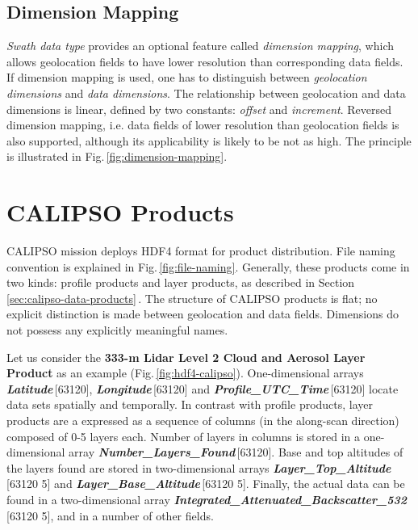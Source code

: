 \subsection{Dimension Mapping}
\textit{Swath data type} provides an optional feature called \textit{dimension mapping}, which
allows geolocation fields to have lower resolution than corresponding data
fields. If dimension mapping is used, one has to distinguish between
\textit{geolocation
dimensions} and \textit{data dimensions}. The relationship between geolocation
and data
dimensions is linear, defined by two constants: \textit{offset} and
\textit{increment}. Reversed dimension mapping, i.e. data fields of lower
resolution than geolocation fields is also supported, although its
applicability is likely to be not as high. The principle is illustrated in
Fig.\,\ref{fig:dimension-mapping}.


\section{CALIPSO Products}\label{sec:hdf-calipso-products}
CALIPSO mission deploys HDF4 format for product distribution. File naming
convention is explained in Fig.\,\ref{fig:file-naming}. Generally,
these products come in two kinds: profile products and layer products, as
described in Section\,\ref{sec:calipso-data-products}\,.
The structure of CALIPSO products is flat; no explicit distinction is made
between
geolocation and data fields. Dimensions do not possess any explicitly meaningful
names.

Let us consider the \textbf{333-m Lidar Level 2 Cloud and Aerosol Layer Product}
as an
example (Fig.\,\ref{fig:hdf4-calipso}). One-dimensional arrays
\textbf{\textit{Latitude}}\,[63120], \textbf{\textit{Longitude}}\,[63120]
and \textbf{\textit{Profile\_UTC\_Time}}\,[63120] locate data sets spatially
and temporally. In contrast with profile products, layer products are a
expressed
as a sequence of columns (in the along-scan direction) composed of 0-5 layers
each. Number of layers in columns is stored in a one-dimensional array
\textbf{\textit{Number\_Layers\_Found}}\,[63120]. Base and top altitudes of the
layers found are stored in two-dimensional arrays
\textbf{\textit{Layer\_Top\_Altitude}}\,[63120\,\texttimes\,5] and
\textbf{\textit{Layer\_Base\_Altitude}}\,[63120\,\texttimes\,5]. Finally, the
actual data can be found in a two-dimensional
array
\textbf{\textit{
Integrated\_Attenuated\_Backscatter\_532}}\,[63120\,\texttimes\,5],
 and in a number of other fields.

